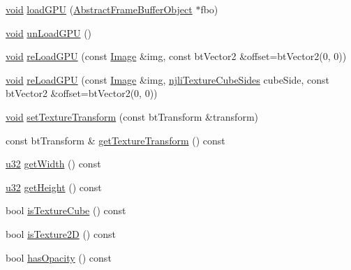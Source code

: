 \begin{DoxyCompactItemize}
\item 
\mbox{\hyperlink{_thread_8h_af1e856da2e658414cb2456cb6f7ebc66}{void}} \mbox{\hyperlink{classnjli_1_1_material_property_a54a76d538f19e7b4bdd29b1106ca92e1}{load\+G\+PU}} (\mbox{\hyperlink{classnjli_1_1_abstract_frame_buffer_object}{Abstract\+Frame\+Buffer\+Object}} $\ast$fbo)
\item 
\mbox{\hyperlink{_thread_8h_af1e856da2e658414cb2456cb6f7ebc66}{void}} \mbox{\hyperlink{classnjli_1_1_material_property_a26086f9fabd9f206fc89ef9e4d1ab351}{un\+Load\+G\+PU}} ()
\item 
\mbox{\hyperlink{_thread_8h_af1e856da2e658414cb2456cb6f7ebc66}{void}} \mbox{\hyperlink{classnjli_1_1_material_property_adb0972e7a2a81e22c59252d609ed4134}{re\+Load\+G\+PU}} (const \mbox{\hyperlink{classnjli_1_1_image}{Image}} \&img, const bt\+Vector2 \&offset=bt\+Vector2(0, 0))
\item 
\mbox{\hyperlink{_thread_8h_af1e856da2e658414cb2456cb6f7ebc66}{void}} \mbox{\hyperlink{classnjli_1_1_material_property_abb3e55b3f32ba67f6e52b3a1af5672be}{re\+Load\+G\+PU}} (const \mbox{\hyperlink{classnjli_1_1_image}{Image}} \&img, \mbox{\hyperlink{namespacenjli_a3287657f79ee806953cdf2a3e719a9dd}{njli\+Texture\+Cube\+Sides}} cube\+Side, const bt\+Vector2 \&offset=bt\+Vector2(0, 0))
\item 
\mbox{\hyperlink{_thread_8h_af1e856da2e658414cb2456cb6f7ebc66}{void}} \mbox{\hyperlink{classnjli_1_1_material_property_a8c9ed69e9d9965c8aaaa8e5a79ce1d3f}{set\+Texture\+Transform}} (const bt\+Transform \&transform)
\item 
const bt\+Transform \& \mbox{\hyperlink{classnjli_1_1_material_property_a0e93c57d80278fff3bc8f873e0cba4da}{get\+Texture\+Transform}} () const
\item 
\mbox{\hyperlink{_util_8h_a10e94b422ef0c20dcdec20d31a1f5049}{u32}} \mbox{\hyperlink{classnjli_1_1_material_property_a03191c04ff259c86536626a6efcaf6d5}{get\+Width}} () const
\item 
\mbox{\hyperlink{_util_8h_a10e94b422ef0c20dcdec20d31a1f5049}{u32}} \mbox{\hyperlink{classnjli_1_1_material_property_a15f1ba5be6e2f5da618dea70c3e2700e}{get\+Height}} () const
\item 
bool \mbox{\hyperlink{classnjli_1_1_material_property_a80ffe6edad2abff10c36fb54ff7640f6}{is\+Texture\+Cube}} () const
\item 
bool \mbox{\hyperlink{classnjli_1_1_material_property_a839469894a0d05814b6947a107e34516}{is\+Texture2D}} () const
\item 
bool \mbox{\hyperlink{classnjli_1_1_material_property_a81e7c9ce6255bf9a4a07215892b1b5fa}{has\+Opacity}} () const

\end{DoxyCompactItemize}

